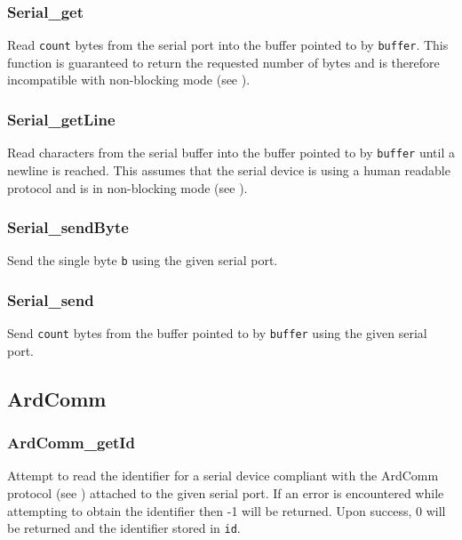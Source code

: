 \subsubsection{Serial\_get} \label{apiserialget}
 Read
\texttt{count} bytes from the serial port into the buffer pointed to by
\texttt{buffer}. This function is guaranteed to return the requested number of
bytes and is therefore incompatible with non-blocking mode (see
).

\subsubsection{Serial\_getLine} \label{apiserialgetlin}
 Read characters from the
serial buffer into the buffer pointed to by \texttt{buffer} until a newline is
reached. This assumes that the serial device is using a human readable protocol
and is in non-blocking mode (see
).

\subsubsection{Serial\_sendByte} \label{apiserialsendbyte}
 Send the single byte
\texttt{b} using the given serial port.

\subsubsection{Serial\_send} \label{apiserialsend}
 Send
\texttt{count} bytes from the buffer pointed to by \texttt{buffer} using the
given serial port.


\subsection{ArdComm} \label{apiardcomm}
\subsubsection{ArdComm\_getId} \label{apiardcommgetid}
 Attempt to read the identifier
for a serial device compliant with the ArdComm protocol (see
) attached to the given
serial port. If an error is encountered while attempting to obtain the
identifier then -1 will be returned. Upon success, 0 will be returned and the
identifier stored in \texttt{id}.

